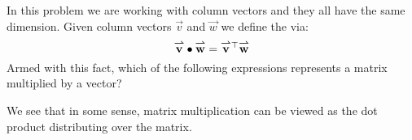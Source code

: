 \documentclass{ximera}
\author{Bart Snapp}
\begin{document}
\begin{exercise}
  In this problem we are working with column vectors and they all have
  the same dimension. Given column vectors $\vec{v}$ and $\vec{w}$ we
  define the  via:
  \[
  {\overset{\boldsymbol{\rightharpoonup}}{\mathbf{v}}}\hspace{0in}\bullet {\overset{\boldsymbol{\rightharpoonup}}{\mathbf{w}}}\hspace{0in} = {\overset{\boldsymbol{\rightharpoonup}}{\mathbf{v}}}\hspace{0in}^\top {\overset{\boldsymbol{\rightharpoonup}}{\mathbf{w}}}\hspace{0in}
  \]
  Armed with this fact, which of the following expressions represents
  a matrix multiplied by a vector?
  \begin{multipleChoice}
  \end{multipleChoice}
  \begin{feedback}[correct]
    We see that in some sense, matrix multiplication can be viewed as
    the dot product distributing over the matrix.
  \end{feedback}
\end{exercise}
\end{document}
